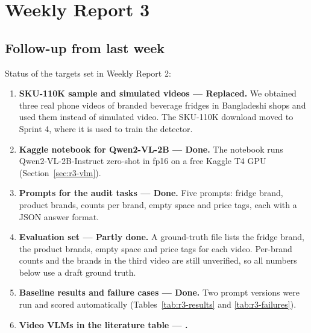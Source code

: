 
\section{Weekly Report 3}

\subsection{Follow-up from last week}
Status of the targets set in Weekly Report 2:
\begin{enumerate}
  \item \textbf{SKU-110K sample and simulated videos --- Replaced.} We obtained three real phone
  videos of branded beverage fridges in Bangladeshi shops and used them instead of simulated
  video. The SKU-110K download moved to Sprint 4, where it is used to train the detector.
  \item \textbf{Kaggle notebook for Qwen2-VL-2B --- Done.} The notebook runs Qwen2-VL-2B-Instruct
  \cite{wang2024qwen2vl} zero-shot in fp16 on a free Kaggle T4 GPU (Section~\ref{sec:r3-vlm}).
  \item \textbf{Prompts for the audit tasks --- Done.} Five prompts: fridge brand, product brands,
  counts per brand, empty space and price tags, each with a JSON answer format.
  \item \textbf{Evaluation set --- Partly done.} A ground-truth file lists the fridge brand, the
  product brands, empty space and price tags for each video. Per-brand counts and the brands in
  the third video are still unverified, so all numbers below use a draft ground truth.
  \item \textbf{Baseline results and failure cases --- Done.} Two prompt versions were run and
  scored automatically (Tables~\ref{tab:r3-results} and \ref{tab:r3-failures}).
  \item \textbf{Video VLMs in the literature table --- .}
\end{enumerate}

